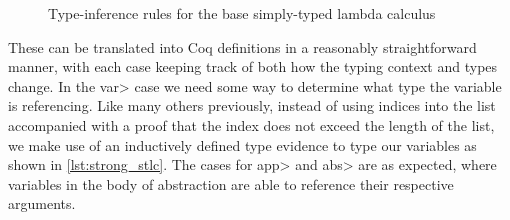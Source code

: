 \documentclass[11pt, final]{article}
\begin{document}
  \begin{figure}
    \caption{Type-inference rules for the base simply-typed lambda calculus}
    \label{fig:base_infer}
  \end{figure}

  These can be translated into Coq definitions in a reasonably straightforward manner, with each case keeping track of both how the typing context and types change.
  In the \<var> case we need some way to determine what type the variable is referencing.
  Like many others previously\cite{Benton2011}\cite{Coquand1994}, instead of using indices into the list accompanied with a proof that the index does not exceed the length of the list, we make use of an inductively defined type evidence to type our variables as shown in \ref{lst:strong_stlc}.
  The cases for \<app> and \<abs> are as expected, where variables in the body of abstraction are able to reference their respective arguments.
\end{document}
